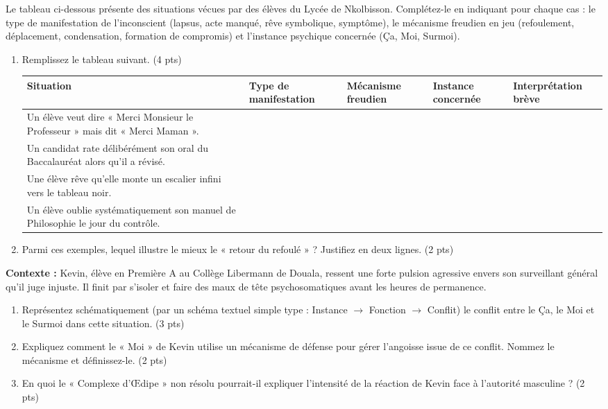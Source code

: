 \documentclass[11pt]{article}
\begin{document}
\begin{exercice}
Le tableau ci-dessous présente des situations vécues par des élèves du Lycée de Nkolbisson. Complétez-le en indiquant pour chaque cas : le type de manifestation de l'inconscient (lapsus, acte manqué, rêve symbolique, symptôme), le mécanisme freudien en jeu (refoulement, déplacement, condensation, formation de compromis) et l'instance psychique concernée (Ça, Moi, Surmoi).

\begin{enumerate}
    \item Remplissez le tableau suivant. (4 pts)
    \begin{tabularx}{\linewidth}{>{\hsize=0.8\hsize}X>{\hsize=1.2\hsize}X>{\hsize=1.5\hsize}X>{\hsize=1.5\hsize}X>{\hsize=1.0\hsize}X}
        \hline
        \textbf{Situation} & \textbf{Type de manifestation} & \textbf{Mécanisme freudien} & \textbf{Instance concernée} & \textbf{Interprétation brève} \\
        \hline
        Un élève veut dire « Merci Monsieur le Professeur » mais dit « Merci Maman ». & & & & \\
        \hline
        Un candidat rate délibérément son oral du Baccalauréat alors qu'il a révisé. & & & & \\
        \hline
        Une élève rêve qu'elle monte un escalier infini vers le tableau noir. & & & & \\
        \hline
        Un élève oublie systématiquement son manuel de Philosophie le jour du contrôle. & & & & \\
        \hline
    \end{tabularx}
    \item Parmi ces exemples, lequel illustre le mieux le « retour du refoulé » ? Justifiez en deux lignes. (2 pts)
\end{enumerate}
\end{exercice}

\begin{exercice}
\textbf{Contexte :} Kevin, élève en Première A au Collège Libermann de Douala, ressent une forte pulsion agressive envers son surveillant général qu'il juge injuste. Il finit par s'isoler et faire des maux de tête psychosomatiques avant les heures de permanence.

\begin{enumerate}
    \item Représentez schématiquement (par un schéma textuel simple type : Instance $\rightarrow$ Fonction $\rightarrow$ Conflit) le conflit entre le Ça, le Moi et le Surmoi dans cette situation. (3 pts)
    \item Expliquez comment le « Moi » de Kevin utilise un mécanisme de défense pour gérer l'angoisse issue de ce conflit. Nommez le mécanisme et définissez-le. (2 pts)
    \item En quoi le « Complexe d'Œdipe » non résolu pourrait-il expliquer l'intensité de la réaction de Kevin face à l'autorité masculine ? (2 pts)
\end{enumerate}
\end{exercice}
\end{document}
